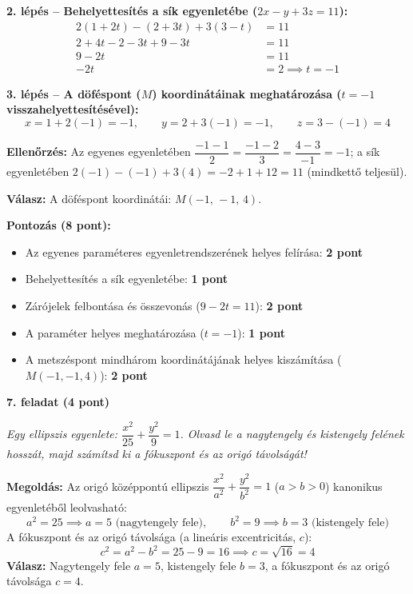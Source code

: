 \documentclass[11pt, a4paper]{article}
\begin{document}
\textbf{2. lépés – Behelyettesítés a sík egyenletébe ($2x - y + 3z = 11$):}
\[
\begin{aligned}
2(1 + 2t) - (2 + 3t) + 3(3 - t) &= 11 \\
2 + 4t - 2 - 3t + 9 - 3t &= 11 \\
9 - 2t &= 11 \\
-2t &= 2 \implies t = -1
\end{aligned}
\]

\textbf{3. lépés – A döféspont ($M$) koordinátáinak meghatározása ($t = -1$ visszahelyettesítésével):}
\[
x = 1 + 2(-1) = -1, \qquad y = 2 + 3(-1) = -1, \qquad z = 3 - (-1) = 4
\]

\textbf{Ellenőrzés:} Az egyenes egyenletében $\dfrac{-1-1}{2} = \dfrac{-1-2}{3} = \dfrac{4-3}{-1} = -1$; a sík egyenletében $2(-1) - (-1) + 3(4) = -2 + 1 + 12 = 11$ (mindkettő teljesül).

\textbf{Válasz:} A döféspont koordinátái: \textbf{$M(-1,\,-1,\,4)$}.

{\color{muted}\small\textbf{Pontozás (8 pont):}}
\begin{itemize}
    \item {\color{muted}\small Az egyenes paraméteres egyenletrendszerének helyes felírása: \textbf{2 pont}}
    \item {\color{muted}\small Behelyettesítés a sík egyenletébe: \textbf{1 pont}}
    \item {\color{muted}\small Zárójelek felbontása és összevonás ($9 - 2t = 11$): \textbf{2 pont}}
    \item {\color{muted}\small A paraméter helyes meghatározása ($t = -1$): \textbf{1 pont}}
    \item {\color{muted}\small A metszéspont mindhárom koordinátájának helyes kiszámítása ($M(-1,-1,4)$): \textbf{2 pont}}
\end{itemize}

\vspace{7pt}{\color{rulegray}\hrule}\vspace{9pt}

{\color{primary}\bfseries 7. feladat (4 pont)}

\textit{Egy ellipszis egyenlete: $\dfrac{x^2}{25}+\dfrac{y^2}{9}=1$. Olvasd le a nagytengely és kistengely felének hosszát, majd számítsd ki a fókuszpont és az origó távolságát!}

\textbf{Megoldás:} Az origó középpontú ellipszis $\dfrac{x^2}{a^2} + \dfrac{y^2}{b^2} = 1$ ($a > b > 0$) kanonikus egyenletéből leolvasható:
\[
a^2 = 25 \implies a = 5 \text{ (nagytengely fele)}, \qquad b^2 = 9 \implies b = 3 \text{ (kistengely fele)}
\]
A fókuszpont és az origó távolsága (a lineáris excentricitás, $c$):
\[
c^2 = a^2 - b^2 = 25 - 9 = 16 \implies c = \sqrt{16} = 4
\]
\textbf{Válasz:} Nagytengely fele \textbf{$a = 5$}, kistengely fele \textbf{$b = 3$}, a fókuszpont és az origó távolsága \textbf{$c = 4$}.
\end{document}
